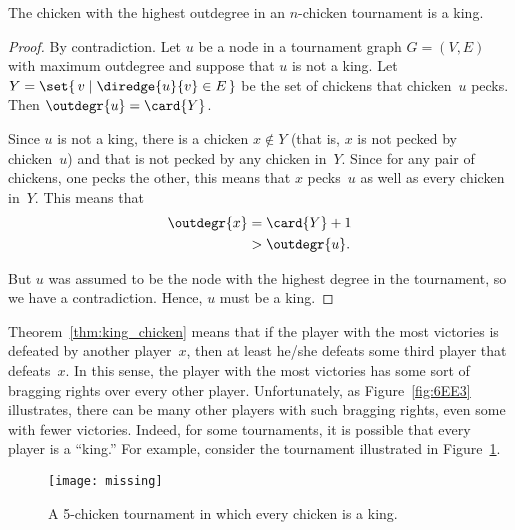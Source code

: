 \begin{theorem}\label{thm:king_chicken}
The chicken with the highest outdegree in an $n$-chicken tournament is
a king.
\end{theorem}

\begin{proof}
By contradiction.  Let $u$ be a node in a tournament graph $G = (V,
E)$ with maximum outdegree and suppose that $u$ is not a king.  Let $Y
= \set{\, v \mid \diredge{u}{v} \in E \,}$ be the set of chickens that
chicken~$u$ pecks.  Then $\outdegr{u} = \card{Y}$.

Since $u$ is not a king, there is a chicken $x \notin Y$ (that is, $x$
is not pecked by chicken~$u$) and that is not pecked by any chicken
in~$Y$.  Since for any pair of chickens, one pecks the other, this
means that $x$ pecks~$u$ as well as every chicken in~$Y$.  This means
that
\begin{align*}
    \outdegr{x} &= \card{Y} + 1 \\
                &> \outdegr{u}.
\end{align*}

But $u$ was assumed to be the node with the highest degree in the
tournament, so we have a contradiction.  Hence, $u$ must be a king.
\end{proof}

Theorem~\ref{thm:king_chicken} means that if the player with the most
victories is defeated by another player~$x$, then at least he/she
defeats some third player that defeats~$x$.  In this sense, the player
with the most victories has some sort of bragging rights over every
other player.  Unfortunately, as Figure~\ref{fig:6EE3} illustrates,
there can be many other players with such bragging rights, even some
with fewer victories.  Indeed, for some tournaments, it is possible
that every player is a ``king.''  For example, consider the tournament
illustrated in Figure~\ref{fig:6EE4}.

\begin{figure}


\texttt{[image: missing]}

\caption{A 5-chicken tournament in which every chicken is a king.}

\label{fig:6EE4}

\end{figure}

